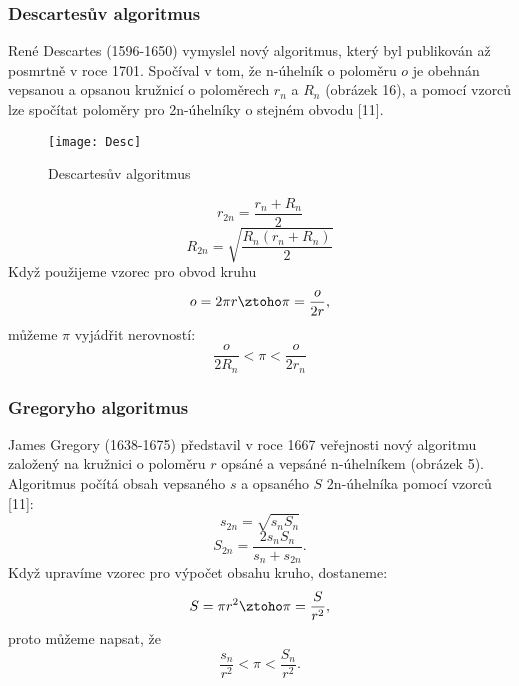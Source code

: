\documentclass[rocnikovka]{gzwroc} %
\begin{document}
\subsubsection{Descartesův algoritmus}
René Descartes (1596-1650) vymyslel nový algoritmus, který byl publikován až posmrtně v roce 1701. Spočíval v tom, že n-úhelník o poloměru $o$ je obehnán vepsanou a opsanou kružnicí o poloměrech $r_n$ a $R_n$ (obrázek 16), a pomocí vzorců lze spočítat poloměry pro 2n-úhelníky o stejném obvodu [11].
\begin{figure}[!ht]
\texttt{[image: Desc]}
\caption{Descartesův algoritmus}
\label{fig:kruh}
\end{figure}
\begin{equation}
r_{2n}=\frac{r_n+R_n}{2}
\end{equation}
\begin{equation}
R_{2n}=\sqrt{\frac{R_n(r_n+R_n)}{2}}
\end{equation}
Když použijeme vzorec pro obvod kruhu
$$
o=2\pi r \ztoho \pi=\frac{o}{2r},
$$
můžeme $\pi$ vyjádřit nerovností:
\begin{equation}
\frac{o}{2R_n}<\pi<\frac{o}{2r_n}
\end{equation}
\subsubsection{Gregoryho algoritmus}
James Gregory (1638-1675) představil v roce 1667 veřejnosti nový algoritmu založený na kružnici o poloměru $r$ opsáné a vepsáné n-úhelníkem (obrázek 5). Algoritmus počítá obsah vepsaného $s$ a opsaného $S$ 2n-úhelníka pomocí vzorců [11]:
\begin{equation}
s_{2n}=\sqrt{s_nS_n}
\end{equation}
\begin{equation}
S_{2n}=\frac{2s_nS_n}{s_n+s_{2n}}.
\end{equation}
Když upravíme vzorec pro výpočet obsahu kruho, dostaneme:
$$
S=\pi r^2 \ztoho \pi=\frac{S}{r^2},
$$
proto můžeme napsat, že
$$
\frac{s_n}{r^2}<\pi<\frac{S_n}{r^2}. 
$$
\end{document}
